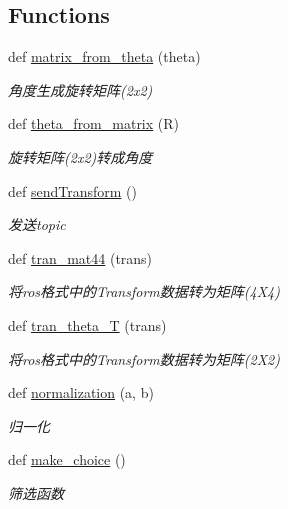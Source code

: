 \subsection*{Functions}
\begin{DoxyCompactItemize}
\item 
def \hyperlink{namespacefuse___g___a_a74f80657b382fa053abcca4f446c4036}{matrix\+\_\+from\+\_\+theta} (theta)
\begin{DoxyCompactList}\small\item\em 角度生成旋转矩阵(2x2) \end{DoxyCompactList}\item 
def \hyperlink{namespacefuse___g___a_aabfeca3b897b1b53700aeb3d5a2b7f74}{theta\+\_\+from\+\_\+matrix} (R)
\begin{DoxyCompactList}\small\item\em 旋转矩阵(2x2)转成角度 \end{DoxyCompactList}\item 
def \hyperlink{namespacefuse___g___a_a6d74da897ef71d656b91058602147dd2}{send\+Transform} ()
\begin{DoxyCompactList}\small\item\em 发送topic \end{DoxyCompactList}\item 
def \hyperlink{namespacefuse___g___a_aebc43ce6f276fb2bbbf7689d12b37589}{tran\+\_\+mat44} (trans)
\begin{DoxyCompactList}\small\item\em 将ros格式中的\+Transform数据转为矩阵(4\+X4) \end{DoxyCompactList}\item 
def \hyperlink{namespacefuse___g___a_afe710c875e91776f6ae39f3c9e73798a}{tran\+\_\+theta\+\_\+T} (trans)
\begin{DoxyCompactList}\small\item\em 将ros格式中的\+Transform数据转为矩阵(2\+X2) \end{DoxyCompactList}\item 
def \hyperlink{namespacefuse___g___a_add9a25d710f1565c5ea9d8706824422b}{normalization} (a, b)
\begin{DoxyCompactList}\small\item\em 归一化 \end{DoxyCompactList}\item 
def \hyperlink{namespacefuse___g___a_a42c3d8256503837ca1b83810899b7ef1}{make\+\_\+choice} ()
\begin{DoxyCompactList}\small\item\em 筛选函数 \end{DoxyCompactList}\end{DoxyCompactItemize}
